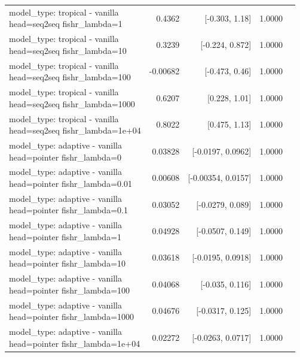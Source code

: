 \documentclass[10pt]{article}
\makeatletter
\newcommand{\stackcell}[1]{\begin{tabular}[t]{@{}l@{}}#1\end{tabular}}
\makeatother
\begin{document}
{\begin{longtable}{lrrrl}
\stackcell{model\_type: tropical - vanilla\\\footnotesize head=seq2seq fishr\_lambda=1 } & 0.4362 & [-0.303, 1.18] & 1.0000 & \\
\stackcell{model\_type: tropical - vanilla\\\footnotesize head=seq2seq fishr\_lambda=10 } & 0.3239 & [-0.224, 0.872] & 1.0000 & \\
\stackcell{model\_type: tropical - vanilla\\\footnotesize head=seq2seq fishr\_lambda=100 } & -0.00682 & [-0.473, 0.46] & 1.0000 & \\
\stackcell{model\_type: tropical - vanilla\\\footnotesize head=seq2seq fishr\_lambda=1000 } & 0.6207 & [0.228, 1.01] & 1.0000 & \\
\stackcell{model\_type: tropical - vanilla\\\footnotesize head=seq2seq fishr\_lambda=1e+04 } & 0.8022 & [0.475, 1.13] & 1.0000 & \\
\stackcell{model\_type: adaptive - vanilla\\\footnotesize head=pointer fishr\_lambda=0 } & 0.03828 & [-0.0197, 0.0962] & 1.0000 & \\
\stackcell{model\_type: adaptive - vanilla\\\footnotesize head=pointer fishr\_lambda=0.01 } & 0.00608 & [-0.00354, 0.0157] & 1.0000 & \\
\stackcell{model\_type: adaptive - vanilla\\\footnotesize head=pointer fishr\_lambda=0.1 } & 0.03052 & [-0.0279, 0.089] & 1.0000 & \\
\stackcell{model\_type: adaptive - vanilla\\\footnotesize head=pointer fishr\_lambda=1 } & 0.04928 & [-0.0507, 0.149] & 1.0000 & \\
\stackcell{model\_type: adaptive - vanilla\\\footnotesize head=pointer fishr\_lambda=10 } & 0.03618 & [-0.0195, 0.0918] & 1.0000 & \\
\stackcell{model\_type: adaptive - vanilla\\\footnotesize head=pointer fishr\_lambda=100 } & 0.04068 & [-0.035, 0.116] & 1.0000 & \\
\stackcell{model\_type: adaptive - vanilla\\\footnotesize head=pointer fishr\_lambda=1000 } & 0.04676 & [-0.0317, 0.125] & 1.0000 & \\
\stackcell{model\_type: adaptive - vanilla\\\footnotesize head=pointer fishr\_lambda=1e+04 } & 0.02272 & [-0.0263, 0.0717] & 1.0000 & \\

\end{longtable}}
\end{document}
